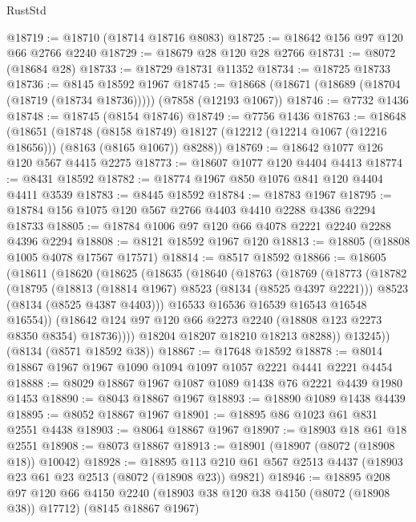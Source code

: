 \begin{lexlean}{RustStd}
\begin{coremodule}
@18719 := @18710 (@18714 @18716 @8083)
@18725 := @18642 @156 @97 @120 @66 @2766 @2240
@18729 := @18679 @28 @120 @28 @2766
@18731 := @8072 (@18684 @28)
@18733 := @18729 @18731 @11352
@18734 := @18725 @18733
@18736 := @8145 @18592 @1967
@18745 := @18668 (@18671 (@18689 (@18704 (@18719 (@18734 @18736))))) (@7858 (@12193 @1067))
@18746 := @7732 @1436
@18748 := @18745 (@8154 @18746)
@18749 := @7756 @1436
@18763 := @18648
    (@18651
      (@18748
        (@8158 @18749)
        @18127
        (@12212 (@12214 @1067 (@12216 @18656)))
        (@8163 (@8165 @1067))
        @8288))
@18769 := @18642 @1077 @126 @120 @567 @4415 @2275
@18773 := @18607 @1077 @120 @4404 @4413
@18774 := @8431 @18592
@18782 := @18774 @1967 @850 @1076 @841 @120 @4404 @4411 @3539
@18783 := @8445 @18592
@18784 := @18783 @1967
@18795 := @18784 @156 @1075 @120 @567 @2766 @4403 @4410 @2288 @4386 @2294 @18733
@18805 := @18784 @1006 @97 @120 @66 @4078 @2221 @2240 @2288 @4396 @2294
@18808 := @8121 @18592 @1967 @120
@18813 := @18805 (@18808 @1005 @4078 @17567 @17571)
@18814 := @8517 @18592
@18866 := @18605
    (@18611
      (@18620
        (@18625
          (@18635
            (@18640
              (@18763
                (@18769
                  (@18773
                    (@18782
                      (@18795
                        (@18813 (@18814 @1967) @8523 (@8134 (@8525 @4397 @2221)))
                        @8523
                        (@8134 (@8525 @4387 @4403)))
                      @16533
                      @16536
                      @16539
                      @16543
                      @16548
                      @16554))
                  (@18642 @124 @97 @120 @66 @2273 @2240 (@18808 @123 @2273 @8350 @8354) @18736))))
            @18204
            @18207
            @18210
            @18213
            @8288))
        @13245))
    (@8134 (@8571 @18592 @38))
@18867 := @17648 @18592
@18878 := @8014 @18867 @1967 @1967 @1090 @1094 @1097 @1057 @2221 @4441 @2221 @4454
@18888 := @8029 @18867 @1967 @1087 @1089 @1438 @76 @2221 @4439 @1980 @1453
@18890 := @8043 @18867 @1967
@18893 := @18890 @1089 @1438 @4439
@18895 := @8052 @18867 @1967
@18901 := @18895 @86 @1023 @61 @831 @2551 @4438
@18903 := @8064 @18867 @1967
@18907 := @18903 @18 @61 @18 @2551
@18908 := @8073 @18867
@18913 := @18901 (@18907 (@8072 (@18908 @18)) @10042)
@18928 := @18895
    @113
    @210
    @61
    @567
    @2513
    @4437
    (@18903 @23 @61 @23 @2513 (@8072 (@18908 @23)) @9821)
@18946 := @18895
    @208
    @97
    @120
    @66
    @4150
    @2240
    (@18903 @38 @120 @38 @4150 (@8072 (@18908 @38)) @17712)
    (@8145 @18867 @1967)

\end{coremodule}
\end{lexlean}
